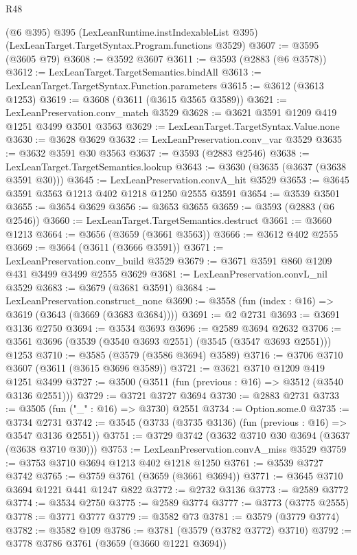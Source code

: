 \begin{lexlean}{R48}
\begin{coremodule}
    (@6 @395)
    @395
    (LexLeanRuntime.instIndexableList @395)
    (LexLeanTarget.TargetSyntax.Program.functions @3529)
@3607 := @3595 (@3605 @79)
@3608 := @3592 @3607
@3611 := @3593 (@2883 (@6 @3578))
@3612 := LexLeanTarget.TargetSemantics.bindAll
@3613 := LexLeanTarget.TargetSyntax.Function.parameters
@3615 := @3612 (@3613 @1253)
@3619 := @3608 (@3611 (@3615 @3565 @3589))
@3621 := LexLeanPreservation.conv_match @3529
@3628 := @3621 @3591 @1209 @419 @1251 @3499 @3501 @3563
@3629 := LexLeanTarget.TargetSyntax.Value.none
@3630 := @3628 @3629
@3632 := LexLeanPreservation.conv_var @3529
@3635 := @3632 @3591 @30 @3563
@3637 := @3593 (@2883 @2546)
@3638 := LexLeanTarget.TargetSemantics.lookup
@3643 := @3630 (@3635 (@3637 (@3638 @3591 @30)))
@3645 := LexLeanPreservation.convA_hit @3529
@3653 := @3645 @3591 @3563 @1213 @402 @1218 @1250 @2555 @3591
@3654 := @3539 @3501
@3655 := @3654 @3629
@3656 := @3653 @3655
@3659 := @3593 (@2883 (@6 @2546))
@3660 := LexLeanTarget.TargetSemantics.destruct
@3661 := @3660 @1213
@3664 := @3656 (@3659 (@3661 @3563))
@3666 := @3612 @402 @2555
@3669 := @3664 (@3611 (@3666 @3591))
@3671 := LexLeanPreservation.conv_build @3529
@3679 := @3671 @3591 @860 @1209 @431 @3499 @3499 @2555 @3629
@3681 := LexLeanPreservation.convL_nil @3529
@3683 := @3679 (@3681 @3591)
@3684 := LexLeanPreservation.construct_none
@3690 := @3558 (fun (index : @16) => @3619 (@3643 (@3669 (@3683 @3684))))
@3691 := @2 @2731
@3693 := @3691 @3136 @2750
@3694 := @3534 @3693
@3696 := @2589 @3694 @2632
@3706 := @3561 @3696 (@3539 (@3540 @3693 @2551) (@3545 (@3547 @3693 @2551))) @1253
@3710 := @3585 (@3579 (@3586 @3694) @3589)
@3716 := @3706 @3710 @3607 (@3611 (@3615 @3696 @3589))
@3721 := @3621 @3710 @1209 @419 @1251 @3499
@3727 := @3500 (@3511 (fun (previous : @16) => @3512 (@3540 @3136 @2551)))
@3729 := @3721 @3727 @3694
@3730 := @2883 @2731
@3733 := @3505 (fun ("_" : @16) => @3730) @2551
@3734 := Option.some.{0}
@3735 := @3734 @2731
@3742 := @3545 (@3733 (@3735 @3136) (fun (previous : @16) => @3547 @3136 @2551))
@3751 := @3729 @3742 (@3632 @3710 @30 @3694 (@3637 (@3638 @3710 @30)))
@3753 := LexLeanPreservation.convA_miss @3529
@3759 := @3753 @3710 @3694 @1213 @402 @1218 @1250
@3761 := @3539 @3727 @3742
@3765 := @3759 @3761 (@3659 (@3661 @3694))
@3771 := @3645 @3710 @3694 @1221 @441 @1247 @822
@3772 := @2732 @3136
@3773 := @2589 @3772
@3774 := @3534 @2750
@3775 := @2589 @3774
@3777 := @3773 (@3775 @2555)
@3778 := @3771 @3777
@3779 := @3582 @73
@3781 := @3579 (@3779 @3774)
@3782 := @3582 @109
@3786 := @3781 (@3579 (@3782 @3772) @3710)
@3792 := @3778 @3786 @3761 (@3659 (@3660 @1221 @3694))

\end{coremodule}
\end{lexlean}
